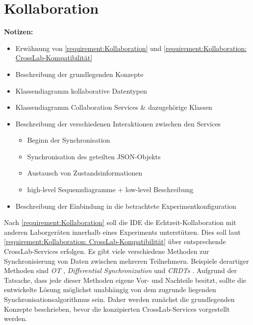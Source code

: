 \section{Kollaboration}\label{section:konzeption:kollaboration}

\usetikzlibrary{arrows.meta}

\begin{note}
    \textbf{Notizen:}
    \begin{itemize}
        \item Erwähnung von \autoref{requirement:Kollaboration} und \autoref{requirement:Kollaboration: CrossLab-Kompatibilität}
        \item Beschreibung der grundlegenden Konzepte
        \item Klassendiagramm kollaborative Datentypen
        \item Klassendiagramm Collaboration Services \& dazugehörige Klassen
        \item Beschreibung der verschiedenen Interaktionen zwischen den Services
              \begin{itemize}
                  \item Beginn der Synchronisation
                  \item Synchronisation des geteilten JSON-Objekts
                  \item Austausch von Zustandsinformationen
                  \item high-level Sequenzdiagramme + low-level Beschreibung
              \end{itemize}
        \item Beschreibung der Einbindung in die betrachtete Experimentkonfiguration
    \end{itemize}
\end{note}

Nach \autoref{requirement:Kollaboration} soll die IDE die Echtzeit-Kollaboration mit anderen Laborgeräten innerhalb eines Experiments unterstützen. Dies soll laut \autoref{requirement:Kollaboration: CrossLab-Kompatibilität} über entsprechende CrossLab-Services erfolgen. Es gibt viele verschiedene Methoden zur Synchronisierung von Daten zwischen mehreren Teilnehmern. Beispiele derartiger Methoden sind \emph{\ac{OT}} \cite{sun_operational_1998}, \emph{Differential Synchronization} \cite{fraser_differential_2009} und \emph{\acp{CRDT}} \cite{shapiro_conflict-free_2011}. Aufgrund der Tatsache, dass jede dieser Methoden eigene Vor- und Nachteile besitzt, sollte die entwickelte Lösung möglichst unabhängig von dem zugrunde liegenden Synchronisationsalgorithmus sein. Daher werden zunächst die grundlegenden Konzepte beschrieben, bevor die konzipierten CrossLab-Services vorgestellt werden.

